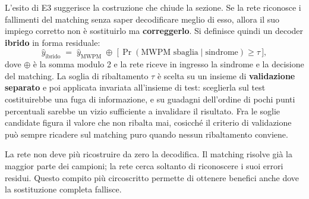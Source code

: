 L'esito di E3 suggerisce la costruzione che chiude la sezione. Se la rete riconosce i fallimenti del matching senza saper decodificare meglio di esso, allora il suo impiego corretto non è sostituirlo ma \textbf{correggerlo}. Si definisce quindi un decoder \textbf{ibrido} in forma residuale:
\begin{equation}
    \hat{y}_{\text{ibrido}} \;=\; \hat{y}_{\text{MWPM}} \;\oplus\; \big[\, \Pr(\text{MWPM sbaglia} \mid \text{sindrome}) \geq \tau \,\big],
    \label{eq:decoder_ibrido}
\end{equation}
dove $\oplus$ è la somma modulo 2 e la rete riceve in ingresso la sindrome e la decisione del matching. La soglia di ribaltamento $\tau$ è scelta su un insieme di \textbf{validazione separato} e poi applicata invariata all'insieme di test: sceglierla sul test costituirebbe una fuga di informazione, e su guadagni dell'ordine di pochi punti percentuali sarebbe un vizio sufficiente a invalidare il risultato. Fra le soglie candidate figura il valore che non ribalta mai, cosicché il criterio di validazione può sempre ricadere sul matching puro quando nessun ribaltamento conviene.

La rete non deve più ricostruire da zero la decodifica. Il matching risolve già la maggior parte dei campioni; la rete cerca soltanto di riconoscere i suoi errori residui. Questo compito più circoscritto permette di ottenere benefici anche dove la sostituzione completa fallisce.

